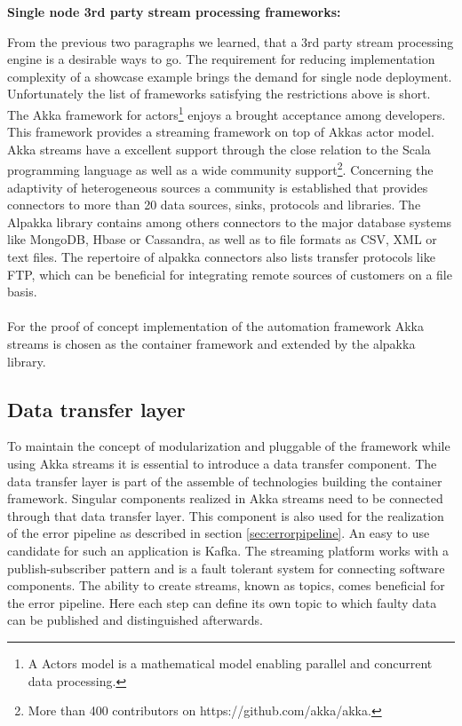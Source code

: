 \textbf{Single node 3rd party stream processing frameworks:}

\noindent From the previous two paragraphs we learned, that a 3rd party stream processing engine is a desirable ways to go. The requirement for reducing implementation complexity of a showcase example brings the demand for single node deployment. Unfortunately the list of frameworks satisfying the restrictions above is short. The Akka framework for actors\footnote{A Actors model is a mathematical model enabling parallel and concurrent data processing.}\cite{akka_2017} enjoys a brought acceptance among developers. This framework provides a streaming framework on top of Akkas actor model. Akka streams\cite{akka_streams_2017} have a excellent support through the close relation to the Scala programming language as well as a wide community support\footnote{More than 400 contributors on https://github.com/akka/akka.}. Concerning the adaptivity of heterogeneous sources a community is established that provides connectors to more than 20 data sources, sinks, protocols and libraries. The Alpakka library\cite{alpakka_2016} contains among others connectors to the major database systems like MongoDB, Hbase or Cassandra, as well as to file formats as CSV, XML or text files. The repertoire of alpakka connectors also lists transfer protocols like FTP, which can be beneficial for integrating remote sources of customers on a file basis.
\\\\
For the proof of concept implementation of the automation framework Akka streams is chosen as the container framework and extended by the alpakka library. 

\subsection{Data transfer layer}
To maintain the concept of modularization and pluggable of the framework while using Akka streams it is essential to introduce a data transfer component. The data transfer layer is part of the assemble of technologies building the container framework. Singular components realized in Akka streams need to be connected through that data transfer layer. This component is also used for the realization of the error pipeline as described in section \ref{sec:errorpipeline}. An easy to use candidate for such an application is Kafka. The streaming platform works with a publish-subscriber pattern and is a fault tolerant system for connecting software components. The ability to create streams, known as topics, comes beneficial for the error pipeline. Here each step can define its own topic to which faulty data can be published and distinguished afterwards.

